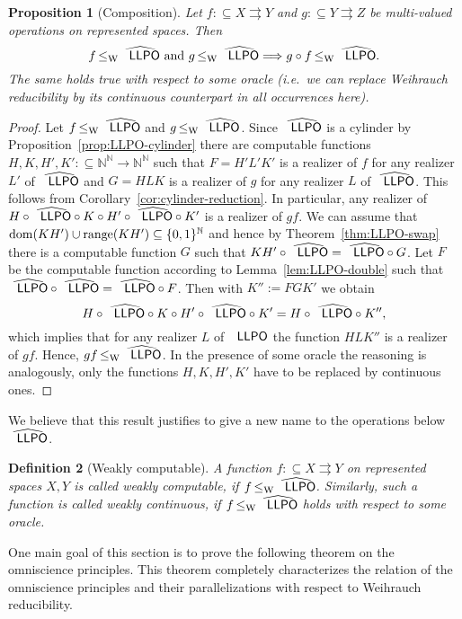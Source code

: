 \documentclass[jsl,10pt]{noasl}
\def\IN{{\mathbb{N}}}
\def\TO{\Longrightarrow}
\def\In{\subseteq}
\def\mto{\rightrightarrows}
\def\dom{{\rm dom}}
\def\range{{\rm range}}
\def\LLPO{\text{\rm\sffamily LLPO}}
\def\LLPO{\text{\rm\sffamily LLPO}}
\def\leqW{\mathop{\leq_{\mathrm{W}}}}
\newtheorem{proposition}{Proposition}[section]
\newtheorem{definition}[proposition]{Definition}
\begin{document}
\begin{proposition}[Composition]
\label{prop:LLPO-comp}
Let $f:\In X\mto Y$ and $g:\In Y\mto Z$ be multi-valued operations on 
represented spaces. Then 
\[f\leqW\widehat{\LLPO}\mbox{ and }g\leqW\widehat{\LLPO}\TO g\circ f\leqW\widehat{\LLPO}.\]
The same holds true with respect to some oracle (i.e.\ we can replace Weih\-rauch reducibility
by its continuous counterpart in all occurrences here).
\end{proposition}
\begin{proof}
Let $f\leqW\widehat{\LLPO}$ and $g\leqW\widehat{\LLPO}$.
Since $\widehat{\LLPO}$ is a cylinder by Proposition~\ref{prop:LLPO-cylinder}  
there are computable functions $H,K,H',K':\In\IN^\IN\to\IN^\IN$ such that
$F=H'L'K'$ is a realizer of $f$ for any realizer $L'$ of $\widehat{\LLPO}$
and $G=HLK$ is a realizer of $g$ for any realizer $L$ of $\widehat{\LLPO}$.
This follows from Corollary~\ref{cor:cylinder-reduction}.
In particular, any realizer of $H\circ\widehat{\LLPO}\circ K\circ H'\circ\widehat{\LLPO}\circ K'$
is a realizer of $gf$. 
We can assume that $\dom(KH')\cup\range(KH')\In\{0,1\}^\IN$      
and hence by Theorem~\ref{thm:LLPO-swap}
there is a computable function $G$ such that $KH'\circ\widehat{\LLPO}=\widehat{\LLPO}\circ G$.
Let $F$ be the computable function according to Lemma~\ref{lem:LLPO-double} such that
$\widehat{\LLPO}\circ\widehat{\LLPO}=\widehat{\LLPO}\circ F$. Then with $K'':=FGK'$ we obtain
\[H\circ\widehat{\LLPO}\circ K\circ H'\circ\widehat{\LLPO}\circ K'=H\circ\widehat{\LLPO}\circ K'',\]
which implies that for any realizer $L$ of $\LLPO$ the function $HLK''$ is a realizer
of $gf$. Hence, $gf\leqW\widehat{\LLPO}$.
In the presence of some oracle the reasoning is analogously,
only the functions $H,K,H',K'$ have to be replaced by continuous ones.
\end{proof}

We believe that this result justifies to give a new name to the operations below
$\widehat{\LLPO}$. 

\begin{definition}[Weakly computable]\rm
A function $f:\In X\mto Y$ on represented spaces $X,Y$ is called {\em weakly computable},
if $f\leqW\widehat{\LLPO}$. Similarly, such a function is called {\em weakly continuous},
if $f\leqW\widehat{\LLPO}$ holds with respect to some oracle.
\end{definition}

One main goal of this section is to prove the following theorem
on the omniscience principles. This theorem completely characterizes the relation 
of the omniscience principles and their parallelizations with respect to Weihrauch 
reducibility.
\end{document}
